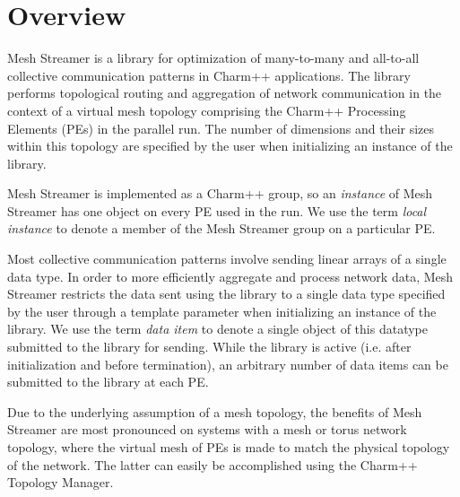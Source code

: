 
%



\section{Overview}

Mesh Streamer is a library for optimization of many-to-many and
all-to-all collective communication patterns in Charm++
applications. The library performs topological routing and aggregation
of network communication in the context of a virtual mesh topology
comprising the Charm++ Processing Elements (PEs) in the parallel
run. The number of dimensions and their sizes within this topology are
specified by the user when initializing an instance of the library.

Mesh Streamer is implemented as a Charm++ group, so an \emph{instance}
of Mesh Streamer has one object on every PE used in the run. We use
the term \emph{local instance} to denote a member of the Mesh Streamer
group on a particular PE. 

Most collective communication patterns involve sending linear arrays
of a single data type. In order to more efficiently aggregate and
process network data, Mesh Streamer restricts the data sent using the
library to a single data type specified by the user through a template
parameter when initializing an instance of the library. We use the
term \emph{data item} to denote a single object of this datatype
submitted to the library for sending. While the library is active
(i.e. after initialization and before termination), an arbitrary
number of data items can be submitted to the library at each PE.

Due to the underlying assumption of a mesh topology, the
benefits of Mesh Streamer are most pronounced on systems with a mesh
or torus network topology, where the virtual mesh of PEs is made to
match the physical topology of the network. The latter can easily be
accomplished using the Charm++ Topology Manager.

